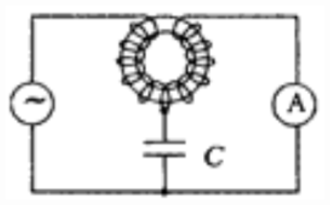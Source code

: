 \documentclass{article}
\begin{document}
{\begin{minipage}[t]{0.5\textwidth}
    \hfill
    \begin{minipage}[t]{0.45\textwidth}
      \begin{center}
        \includegraphics[width=0.9\textwidth]{src/6-picture.png}
      \end{center} 
    \end{minipage}
  \end{minipage}
}
\end{document}
